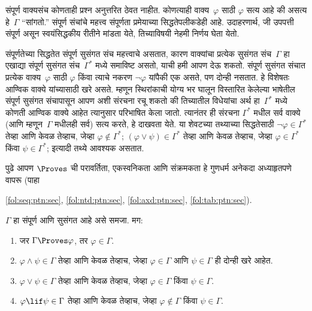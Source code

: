 \begin{explain}
संपूर्ण वाक्यसंच कोणताही प्रश्न अनुत्तरित ठेवत नाहीत. कोणत्याही
वाक्य~$\varphi$ साठी $\varphi$ सत्य आहे की असत्य हे~$\Gamma$ “सांगतो.”
संपूर्ण संचांचे महत्त्व संपूर्णता प्रमेयाच्या सिद्धतेपलीकडेही आहे.
उदाहरणार्थ, जी उपपत्ती संपूर्ण असून स्वयंसिद्धकीय रीतीने मांडता
येते, तिच्याविषयी नेहमी निर्णय घेता येतो.
\end{explain}

\begin{explain}
संपूर्णतेच्या सिद्धतेत संपूर्ण सुसंगत संच महत्त्वाचे असतात, कारण
वाक्यांचा प्रत्येक सुसंगत संच~$\Gamma$ हा एखाद्या संपूर्ण
सुसंगत संच~$\Gamma^*$ मध्ये समाविष्ट असतो, याची हमी आपण देऊ शकतो.
संपूर्ण सुसंगत संचात प्रत्येक वाक्य~$\varphi$ साठी $\varphi$ किंवा
त्याचे नकरण $\lnot \varphi$ यांपैकी एक असते, पण दोन्ही नसतात. हे विशेषतः
आण्विक वाक्ये यांच्यासाठी खरे असते.
म्हणून स्थिरांकाची योग्य भर घालून विस्तारित केलेल्या
भाषेतील संपूर्ण सुसंगत संचापासून आपण अशी
संरचना रचू शकतो की तिच्यातील
विधेयांचा अर्थ
हा~$\Gamma^*$ मध्ये कोणती आण्विक
वाक्ये आहेत त्यानुसार परिभाषित
केला जातो. त्यानंतर ही संरचना
$\Gamma^*$ मधील सर्व वाक्ये (आणि म्हणून~$\Gamma$ मधीलही सर्व)
सत्य करते, हे दाखवता येते. या शेवटच्या तथ्याच्या सिद्धतेसाठी
$\lnot \varphi \in \Gamma^*$ तेव्हा आणि केवळ तेव्हाच, जेव्हा $\varphi \notin
\Gamma^*$; $(\varphi \lor \psi) \in \Gamma^*$ तेव्हा आणि केवळ तेव्हाच, जेव्हा
$\varphi \in \Gamma^*$ किंवा $\psi \in \Gamma^*$; इत्यादी तथ्ये आवश्यक असतात.
\end{explain}

पुढे आपण $\Proves$ ची परावर्तिता, एकस्वनिकता आणि संक्रमकता हे गुणधर्म
अनेकदा अध्याहृतपणे वापरू (पाहा

  \ref{fol:seq:ptn:sec}, \ref{fol:ntd:ptn:sec}, \ref{fol:axd:ptn:sec}, \ref{fol:tab:ptn:sec}).

\begin{prop}
\label{fol:com:ccs:prop:ccs}
$\Gamma$ हा संपूर्ण आणि सुसंगत आहे असे समजा. मग:
\begin{enumerate}
\item \label{fol:com:ccs:prop:ccs-prov-in} जर $\Gamma \Proves \varphi$, तर $\varphi \in
  \Gamma$.

\item \label{fol:com:ccs:prop:ccs-and} $\varphi \land \psi \in \Gamma$
  तेव्हा आणि केवळ तेव्हाच, जेव्हा $\varphi \in \Gamma$ आणि $\psi \in \Gamma$
  ही दोन्ही खरे आहेत.

\item \label{fol:com:ccs:prop:ccs-or} $\varphi \lor \psi \in \Gamma$ तेव्हा
  आणि केवळ तेव्हाच, जेव्हा $\varphi \in \Gamma$ किंवा $\psi \in \Gamma$.

\item \label{fol:com:ccs:prop:ccs-if} $\varphi \lif \psi \in \Gamma$ तेव्हा
  आणि केवळ तेव्हाच, जेव्हा $\varphi \notin \Gamma$ किंवा $\psi \in \Gamma$.
\end{enumerate}
\end{prop}

